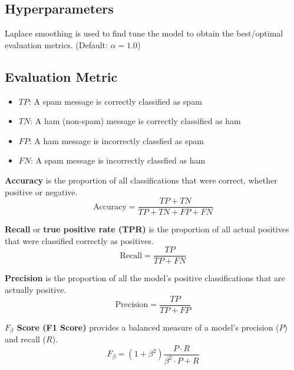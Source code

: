 \subsection{Hyperparameters}

Laplace smoothing is used to find tune the model to obtain the best/optimal evaluation metrics. (Default: $\alpha = 1.0$)




\subsection{Evaluation Metric \cite{google_accuracy}}

\begin{itemize}
    \item $TP$: A spam message is correctly classified as spam
    \item $TN$: A ham (non-spam) message is correctly classified as ham
    \item $FP$: A ham message is incorrectly classfied as spam
    \item $FN$: A spam message is incorrectly classfied as ham
\end{itemize}


\textbf{Accuracy} is the proportion of all classifications that were correct, whether positive or negative.
\begin{equation}
    \text{Accuracy} = \frac{TP + TN}{TP + TN + FP + FN}
\end{equation}

\textbf{Recall} or \textbf{true positive rate (TPR)} is the proportion of all actual positives that were classified correctly as positives.
\begin{equation}
    \text{Recall} = \frac{TP}{TP + FN}
\end{equation}


\textbf{Precision} is the proportion of all the model's positive classifications that are actually positive.
\begin{equation}
    \text{Precision} = \frac{TP}{TP + FP}
\end{equation}

\textbf{$F_\beta$ Score (F1 Score)} provides a balanced measure of a model's precision ($P$) and recall ($R$).
\begin{equation}
    F_\beta = (1 + \beta^2) \frac{P \cdot R}{\beta^2 \cdot P + R}
\end{equation}

